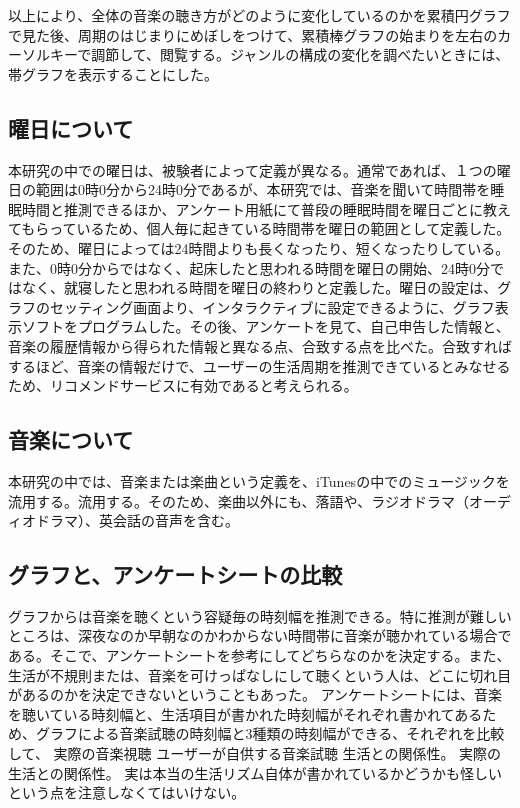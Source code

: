 \documentclass[11pt, twocolumn]{jsarticle}
\begin{document}
以上により、全体の音楽の聴き方がどのように変化しているのかを累積円グラフで見た後、周期のはじまりにめぼしをつけて、累積棒グラフの始まりを左右のカーソルキーで調節して、閲覧する。ジャンルの構成の変化を調べたいときには、帯グラフを表示することにした。

\subsection{曜日について}
本研究の中での曜日は、被験者によって定義が異なる。通常であれば、１つの曜日の範囲は0時0分から24時0分であるが、本研究では、音楽を聞いて時間帯を睡眠時間と推測できるほか、アンケート用紙にて普段の睡眠時間を曜日ごとに教えてもらっているため、個人毎に起きている時間帯を曜日の範囲として定義した。そのため、曜日によっては24時間よりも長くなったり、短くなったりしている。また、0時0分からではなく、起床したと思われる時間を曜日の開始、24時0分ではなく、就寝したと思われる時間を曜日の終わりと定義した。曜日の設定は、グラフのセッティング画面より、インタラクティブに設定できるように、グラフ表示ソフトをプログラムした。その後、アンケートを見て、自己申告した情報と、音楽の履歴情報から得られた情報と異なる点、合致する点を比べた。合致すればするほど、音楽の情報だけで、ユーザーの生活周期を推測できているとみなせるため、リコメンドサービスに有効であると考えられる。

\subsection{音楽について}
本研究の中では、音楽または楽曲という定義を、iTunesの中でのミュージックを流用する。流用する。そのため、楽曲以外にも、落語や、ラジオドラマ（オーディオドラマ）、英会話の音声を含む。

\subsection{グラフと、アンケートシートの比較}
グラフからは音楽を聴くという容疑毎の時刻幅を推測できる。特に推測が難しいところは、深夜なのか早朝なのかわからない時間帯に音楽が聴かれている場合である。そこで、アンケートシートを参考にしてどちらなのかを決定する。また、生活が不規則または、音楽を可けっぱなしにして聴くという人は、どこに切れ目があるのかを決定できないということもあった。
アンケートシートには、音楽を聴いている時刻幅と、生活項目が書かれた時刻幅がそれぞれ書かれてあるため、グラフによる音楽試聴の時刻幅と3種類の時刻幅ができる、それぞれを比較して、
実際の音楽視聴
ユーザーが自供する音楽試聴
生活との関係性。
実際の生活との関係性。
	実は本当の生活リズム自体が書かれているかどうかも怪しいという点を注意しなくてはいけない。
	
\end{document}
